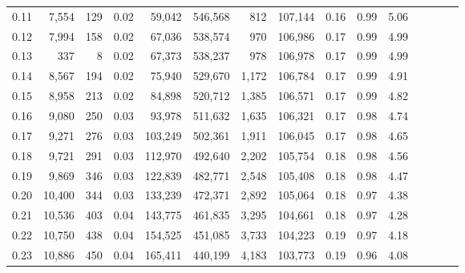 \begin{tabular}{rrrcrrrrrrrrrrr}
0.11 &   7,554 &    129 &                                       0.02 &   59,042 &  546,568 &      812 &  107,144 &  0.16 &  0.99 &                         5.06 \\
0.12 &   7,994 &    158 &                                       0.02 &   67,036 &  538,574 &      970 &  106,986 &  0.17 &  0.99 &                         4.99 \\
0.13 &     337 &      8 &                                       0.02 &   67,373 &  538,237 &      978 &  106,978 &  0.17 &  0.99 &                         4.99 \\
0.14 &   8,567 &    194 &                                       0.02 &   75,940 &  529,670 &    1,172 &  106,784 &  0.17 &  0.99 &                         4.91 \\
0.15 &   8,958 &    213 &                                       0.02 &   84,898 &  520,712 &    1,385 &  106,571 &  0.17 &  0.99 &                         4.82 \\
0.16 &   9,080 &    250 &                                       0.03 &   93,978 &  511,632 &    1,635 &  106,321 &  0.17 &  0.98 &                         4.74 \\
0.17 &   9,271 &    276 &                                       0.03 &  103,249 &  502,361 &    1,911 &  106,045 &  0.17 &  0.98 &                         4.65 \\
0.18 &   9,721 &    291 &                                       0.03 &  112,970 &  492,640 &    2,202 &  105,754 &  0.18 &  0.98 &                         4.56 \\
0.19 &   9,869 &    346 &                                       0.03 &  122,839 &  482,771 &    2,548 &  105,408 &  0.18 &  0.98 &                         4.47 \\
0.20 &  10,400 &    344 &                                       0.03 &  133,239 &  472,371 &    2,892 &  105,064 &  0.18 &  0.97 &                         4.38 \\
0.21 &  10,536 &    403 &                                       0.04 &  143,775 &  461,835 &    3,295 &  104,661 &  0.18 &  0.97 &                         4.28 \\
0.22 &  10,750 &    438 &                                       0.04 &  154,525 &  451,085 &    3,733 &  104,223 &  0.19 &  0.97 &                         4.18 \\
0.23 &  10,886 &    450 &                                       0.04 &  165,411 &  440,199 &    4,183 &  103,773 &  0.19 &  0.96 &                         4.08 \\

\end{tabular}
